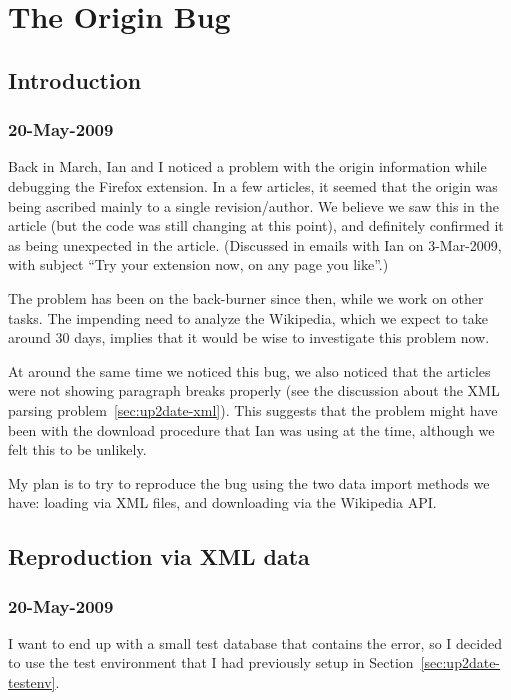 \chapter{The Origin Bug}

\section{Introduction}

\subsection{20-May-2009}

Back in March, Ian and I noticed a problem with the origin information
while debugging the Firefox extension.
In a few articles, it seemed that the origin was being ascribed
mainly to a single revision/author.
We believe we saw this in the  article
(but the code was still changing at this point),
and definitely confirmed it as being unexpected in
the  article.
(Discussed in emails with Ian on 3-Mar-2009,
with subject ``Try your extension now,
on any page you like''.)

The problem has been on the back-burner since then,
while we work on other tasks.
The impending need to analyze the Wikipedia, which we expect
to take around 30 days, implies that it would be wise to
investigate this problem now.

At around the same time we noticed this bug, we
also noticed that the articles were not showing
paragraph breaks properly (see the discussion about
the XML parsing problem~\ref{sec:up2date-xml}).
This suggests that the problem might have been with
the download procedure that Ian was using at the time,
although we felt this to be unlikely.

My plan is to try to reproduce the bug using the
two data import methods we have: loading via XML files,
and downloading via the Wikipedia API.

\section{Reproduction via XML data}

\subsection{20-May-2009}

I want to end up with a small test database that contains
the error, so I decided to use the test environment that
I had previously setup in Section~\ref{sec:up2date-testenv}.

